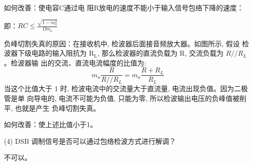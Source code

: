 \documentclass{../source/Experiment}
\begin{document}
如何改善：使电容C通过电
阻R放电的速度不能小于输入信号包络下降的速度：

即：$R C \leq \frac{\sqrt{1-m_{a}^{2}}}{\Omega m_{a}}$

负峰切割失真的原因：在接收机中, 检波器后面接音频放大器。如图所示, 假设 检波器下级电路的输入阻抗为 $\mathrm{R}_{\mathrm{L}}$, 那么检波器的直流负载为 $\mathrm{R}$, 交流负载为 $R / / R_{L}$ 。检波器输 出的交流、直流电流幅度的比值为:
$$
    m_{a} \frac{R}{R / / R_{L}}=m_{a} \frac{R+R_{L}}{R_{L}}
$$
当这个比值大于 1 时, 检波电流中的交流量大于直流量, 电流出现负值。因为二极管是单 向导电的, 电流不可能为负值, 只能为零, 所以检波输出电压的负峰值被削平, 也就是产生 负峰切割失真。

如何改善：使上述比值小于1。


(4) DSB 调制信号是否可以通过包络检波方式进行解调？

不可以。
\end{document}
